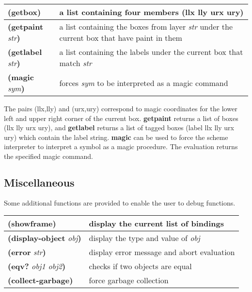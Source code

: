 \documentclass[letterpaper,twoside,12pt]{article}
\begin{document}
\begin{center}
   \begin{tabular}{|l|p{}|} \hline
	{\bfseries (getbox)} &
		a list containing four members (llx lly urx ury) \\ \hline
	{\bfseries (getpaint }{\itshape str}{\bfseries )} &
		a list containing the boxes from layer {\itshape str}
		under the current box that have paint in them \\ \hline
	{\bfseries (getlabel }{\itshape str}{\bfseries )} &
		a list containing the labels under the current box that
		match {\itshape str} \\ \hline
	{\bfseries (magic }{\itshape sym}{\bfseries )} &
		forces {\itshape sym} to be interpreted as a
		magic command \\ \hline
   \end{tabular}
\end{center}

The pairs (llx,lly) and (urx,ury) correspond to magic coordinates for
the lower left and upper right corner of the current
box. {\bfseries getpaint} returns a list of boxes (llx lly urx ury), and
{\bfseries getlabel} returns a list of tagged boxes (label llx lly urx ury)
which contain the label string. {\bfseries magic} can be used to force the
scheme interpreter to interpret a symbol as a magic procedure. The
evaluation returns the specified magic command.


\subsection{Miscellaneous}

Some additional functions are provided to enable the user to debug
functions.

\begin{center}
   \begin{tabular}{|l|l|} \hline
	{\bfseries (showframe)}	&
		display the current list of bindings \\ \hline
	{\bfseries (display-object }{\itshape obj}{\bfseries )} &
		display the type and value of {\itshape obj} \\ \hline
	{\bfseries (error }{\itshape str}{\bfseries )} &
		display error message and abort evaluation \\ \hline
	{\bfseries (eqv? }{\itshape obj1 obj2}{\bfseries )} &
		checks if two objects are equal \\ \hline
	{\bfseries (collect-garbage)} &
		force garbage collection \\ \hline
   \end{tabular}
\end{center}
\end{document}
